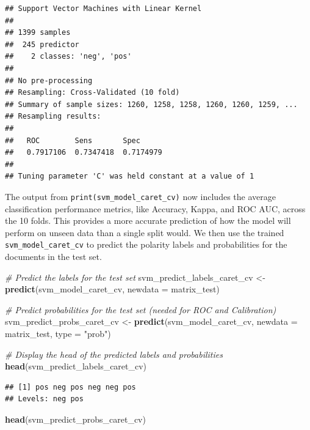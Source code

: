 \documentclass[
]{book}
\newenvironment{Shaded}{\begin{snugshade}}{\end{snugshade}}
\newcommand{\AttributeTok}[1]{\textcolor[rgb]{0.13,0.29,0.53}{#1}}
\newcommand{\CommentTok}[1]{\textcolor[rgb]{0.56,0.35,0.01}{\textit{#1}}}
\newcommand{\FunctionTok}[1]{\textcolor[rgb]{0.13,0.29,0.53}{\textbf{#1}}}
\newcommand{\NormalTok}[1]{#1}
\newcommand{\OtherTok}[1]{\textcolor[rgb]{0.56,0.35,0.01}{#1}}
\newcommand{\StringTok}[1]{\textcolor[rgb]{0.31,0.60,0.02}{#1}}
\begin{document}
\begin{verbatim}
## Support Vector Machines with Linear Kernel 
## 
## 1399 samples
##  245 predictor
##    2 classes: 'neg', 'pos' 
## 
## No pre-processing
## Resampling: Cross-Validated (10 fold) 
## Summary of sample sizes: 1260, 1258, 1258, 1260, 1260, 1259, ... 
## Resampling results:
## 
##   ROC        Sens       Spec     
##   0.7917106  0.7347418  0.7174979
## 
## Tuning parameter 'C' was held constant at a value of 1
\end{verbatim}

The output from \texttt{print(svm\_model\_caret\_cv)} now includes the average classification performance metrics, like Accuracy, Kappa, and ROC AUC, across the 10 folds. This provides a more accurate prediction of how the model will perform on unseen data than a single split would. We then use the trained \texttt{svm\_model\_caret\_cv} to predict the polarity labels and probabilities for the documents in the test set.

\begin{Shaded}
\begin{Highlighting}[]
\CommentTok{\# Predict the labels for the test set}
\NormalTok{svm\_predict\_labels\_caret\_cv }\OtherTok{\textless{}{-}} \FunctionTok{predict}\NormalTok{(svm\_model\_caret\_cv, }\AttributeTok{newdata =}\NormalTok{ matrix\_test)}

\CommentTok{\# Predict probabilities for the test set (needed for ROC and Calibration)}
\NormalTok{svm\_predict\_probs\_caret\_cv }\OtherTok{\textless{}{-}} \FunctionTok{predict}\NormalTok{(svm\_model\_caret\_cv, }\AttributeTok{newdata =}\NormalTok{ matrix\_test,}
    \AttributeTok{type =} \StringTok{"prob"}\NormalTok{)}

\CommentTok{\# Display the head of the predicted labels and probabilities}
\FunctionTok{head}\NormalTok{(svm\_predict\_labels\_caret\_cv)}
\end{Highlighting}
\end{Shaded}

\begin{verbatim}
## [1] pos neg pos neg neg pos
## Levels: neg pos
\end{verbatim}

\begin{Shaded}
\begin{Highlighting}[]
\FunctionTok{head}\NormalTok{(svm\_predict\_probs\_caret\_cv)}
\end{Highlighting}
\end{Shaded}
\end{document}
